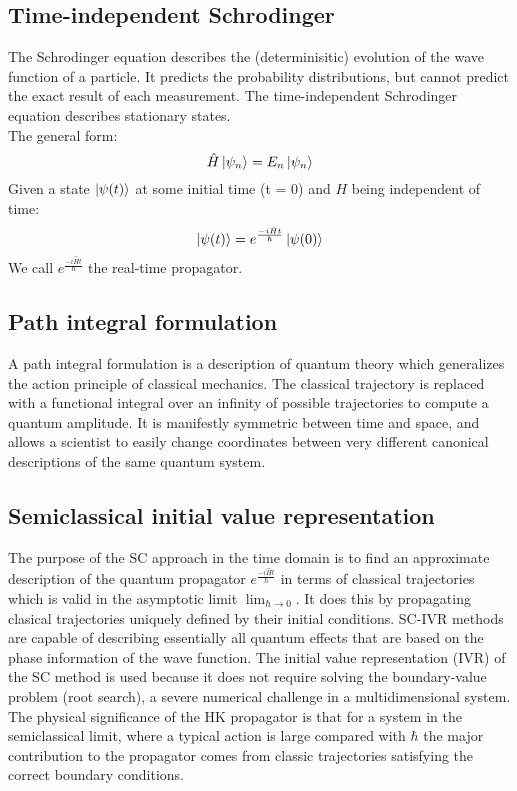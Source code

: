 \documentclass[12pt,letterpaper,oneside,final,titlepage]{article}               %
\numberwithin{equation}{section} %
\newcommand{\emiHt}{e^{\frac{-i\hat{H}t}{\hbar}}}
\begin{document}
\subsection{Time-independent Schrodinger}
The Schrodinger equation describes the (determinisitic) evolution of the wave function of a particle.
It predicts the probability distributions, but cannot predict the exact result of each measurement.
The time-independent Schrodinger equation describes stationary states. \\
The general form:
\begin{equation}
    \hat{H}\ket{\psi_{n}} = E_{n}\ket{\psi_{n}}
\end{equation}
Given a state $\ket{\psi(t)}$ at some initial time (t = 0) and $H$ being independent of time:
\begin{equation}
    \ket{\psi(t)} = \emiHt\ket{\psi(0)}
\end{equation}
We call $\emiHt$ the real-time propagator.


\subsection{Path integral formulation}
A path integral formulation is a description of quantum theory which generalizes the action principle of classical mechanics.
The classical trajectory is replaced with a functional integral over an infinity of possible trajectories to compute a quantum amplitude.
It is manifestly symmetric between time and space, and allows a scientist to easily change coordinates between very different canonical descriptions of the same quantum system. 


\subsection{Semiclassical initial value representation}
The purpose of the SC approach in the time domain is to find an approximate description of the quantum propagator $\emiHt$ 
in terms of classical trajectories which is valid in the asymptotic limit $\lim_{\hbar \to 0}$.
It does this by propagating clasical trajectories uniquely defined by their initial conditions.
SC-IVR methods are capable of describing essentially all quantum effects that are based on the phase information of the wave function.
The initial value representation (IVR) of the SC method is used because it does not require solving the boundary-value problem (root search), a severe numerical challenge in a multidimensional system. \\
The physical significance of the HK propagator is that for a system in the semiclassical limit, where a typical action is large compared with $\hbar$ the major contribution to the propagator comes from classic trajectories satisfying the correct boundary conditions.
\end{document}
